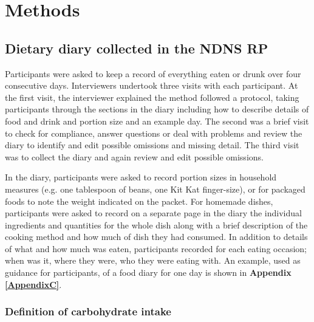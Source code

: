 
\chapter{Methods} %

\label{Chapter 2} %


\section{Dietary diary collected in the NDNS RP}\vspace{-0.3cm}

Participants were asked to keep a record of everything eaten or drunk over four consecutive days. Interviewers undertook three visits with each participant. At the first visit, the interviewer explained the method followed a protocol, taking participants through the sections in the diary including how to describe details of food and drink and portion size and an example day. The second was a brief visit to check for compliance, answer questions or deal with problems and review the diary to identify and edit possible omissions and missing detail. The third visit was to collect the diary and again review and edit possible omissions. 

In the diary, participants were asked to record portion sizes in household measures (e.g. one tablespoon of beans, one Kit Kat finger-size), or for packaged foods to note the weight indicated on the packet. For homemade dishes, participants were asked to record on a separate page in the diary the individual ingredients and quantities for the whole dish along with a brief description of the cooking method and how much of dish they had consumed. In addition to details of what and how much was eaten, participants recorded for each eating occasion; when was it, where they were, who they were eating with. An example, used as guidance for participants, of a food diary for one day is shown in \textbf{Appendix \ref{AppendixC}}.\vspace{-0.3cm}

\subsection{Definition of carbohydrate intake}\vspace{-0.3cm}

